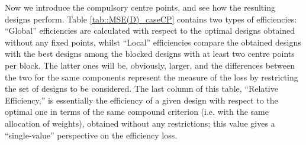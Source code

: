 Now we introduce the compulsory centre points, and see how the resulting designs perform. Table \ref{tab::MSE(D)_caseCP} contains two types of efficiencies: ``Global'' efficiencies are calculated with respect to the optimal designs obtained without any fixed points, whilst ``Local'' efficiencies compare the obtained designs with the best designs among the blocked designs with at least two centre points per block. The latter ones will be, obviously, larger, and the differences between the two for the same components represent the measure of the loss by restricting the set of designs to be considered. The last column of this table, ``Relative Efficiency,'' is essentially the efficiency of a given design with respect to the optimal one in terms of the same compound criterion (i.e. with the same allocation of weights), obtained without any restrictions; this value gives a ``single-value'' perspective on the efficiency loss.  


